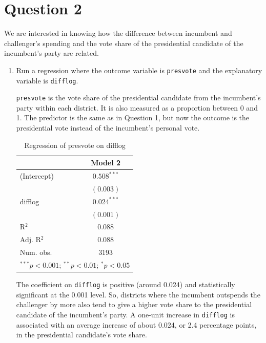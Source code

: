 \documentclass[12pt,letterpaper]{article}
\begin{document}
\section*{Question 2}
\noindent We are interested in knowing how the difference between incumbent and challenger's spending and the vote share of the presidential candidate of the incumbent's party are related.	\vspace{.25cm}
	\begin{enumerate}
		\item Run a regression where the outcome variable is \texttt{presvote} and the explanatory variable is \texttt{difflog}.
		
		\noindent \texttt{presvote} is the vote share of the presidential candidate from the incumbent's party within each district. It is also measured as a proportion between 0 and 1. The predictor is the same as in Question 1, but now the outcome is the presidential vote instead of the incumbent's personal vote.
		
		
		\begin{table} [H]
			\begin{center}
				\begin{tabular}{l c}
					\hline
					& Model 2 \\
					\hline
					(Intercept) & $0.508^{***}$ \\
					& $(0.003)$     \\
					difflog     & $0.024^{***}$ \\
					& $(0.001)$     \\
					\hline
					R$^2$       & $0.088$       \\
					Adj. R$^2$  & $0.088$       \\
					Num. obs.   & $3193$        \\
					\hline
					\multicolumn{2}{l}{\scriptsize{$^{***}p<0.001$; $^{**}p<0.01$; $^{*}p<0.05$}}
				\end{tabular}
				\caption{Regression of presvote on difflog}
				\label{table:model2}
			\end{center}
		\end{table}
		
		\noindent The coefficient on \texttt{difflog} is positive (around 0.024) and statistically significant at the 0.001 level. So, districts where the incumbent outspends the challenger by more also tend to give a higher vote share to the presidential candidate of the incumbent's party. A one-unit increase in \texttt{difflog} is associated with an average increase of about 0.024, or 2.4 percentage points, in the presidential candidate's vote share.
		

\end{enumerate}
\end{document}
